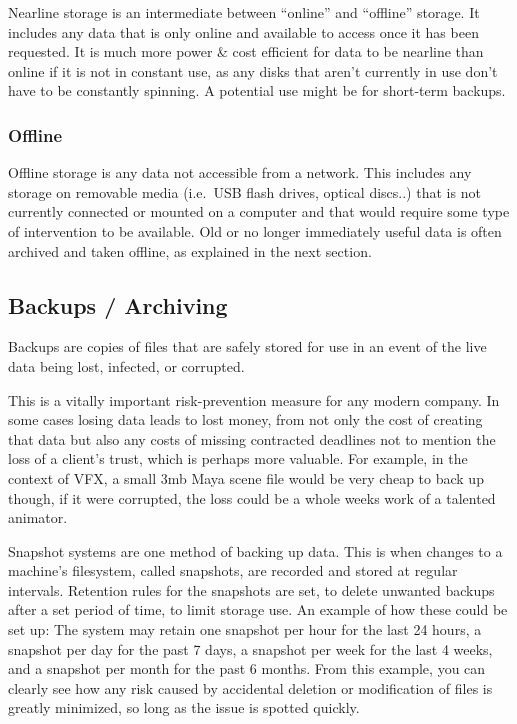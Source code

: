 Nearline storage is an intermediate between ``online'' and ``offline'' storage. It includes any data that is only online and available to access once it has been requested. It is much more power \& cost efficient for data to be nearline than online if it is not in constant use, as any disks that aren't currently in use don't have to be constantly spinning. A potential use might be for short-term backups.

\hypertarget{offline}{%
\subsubsection{Offline}\label{offline}}

Offline storage is any data not accessible from a network. This includes any storage on removable media (i.e.~USB flash drives, optical discs..) that is not currently connected or mounted on a computer and that would require some type of intervention to be available. Old or no longer immediately useful data is often archived and taken offline, as explained in the next section.

\hypertarget{backups-archiving}{%
\subsection{Backups / Archiving}\label{backups-archiving}}

Backups are copies of files that are safely stored for use in an event of the live data being lost, infected, or corrupted.

This is a vitally important risk-prevention measure for any modern company. In some cases losing data leads to lost money, from not only the cost of creating that data but also any costs of missing contracted deadlines not to mention the loss of a client's trust, which is perhaps more valuable. For example, in the context of VFX, a small 3mb Maya scene file would be very cheap to back up though, if it were corrupted, the loss could be a whole weeks work of a talented animator.

Snapshot systems are one method of backing up data. This is when changes to a machine's filesystem, called snapshots, are recorded and stored at regular intervals. Retention rules for the snapshots are set, to delete unwanted backups after a set period of time, to limit storage use. An example of how these could be set up: The system may retain one snapshot per hour for the last 24 hours, a snapshot per day for the past 7 days, a snapshot per week for the last 4 weeks, and a snapshot per month for the past 6 months. From this example, you can clearly see how any risk caused by accidental deletion or modification of files is greatly minimized, so long as the issue is spotted quickly.

